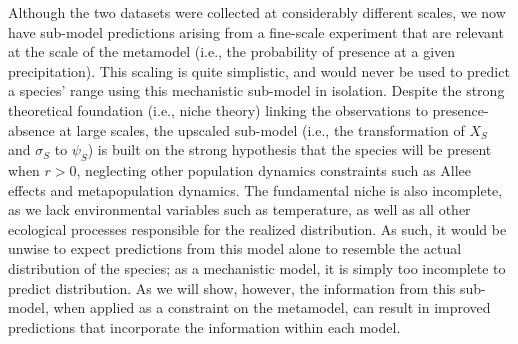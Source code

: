 \documentclass[11pt]{article}
\begin{document}
Although the two datasets were collected at considerably different scales, we now have sub-model predictions arising from a fine-scale experiment that are relevant at the scale of the metamodel (i.e., the probability of presence at a given precipitation). 
This scaling is quite simplistic, and would never be used to predict a species' range using this mechanistic sub-model in isolation.
Despite the strong theoretical foundation (i.e., niche theory) linking the observations to presence-absence at large scales, the upscaled sub-model (i.e., the transformation of \(X_S\) and \(\sigma_S\) to \(\psi_S\)) is built on the strong hypothesis that the species will be present when $r>0$, neglecting other population dynamics constraints such as Allee effects and metapopulation dynamics. 
The fundamental niche is also incomplete, as we lack environmental variables such as temperature, as well as all other ecological processes responsible for the realized distribution.
As such, it would be unwise to expect predictions from this model alone to resemble the actual distribution of the species; as a mechanistic model, it is simply too incomplete to predict distribution.
As we will show, however, the information from this sub-model, when applied as a constraint on the metamodel, can result in improved predictions that incorporate the information within each model.
\end{document}
